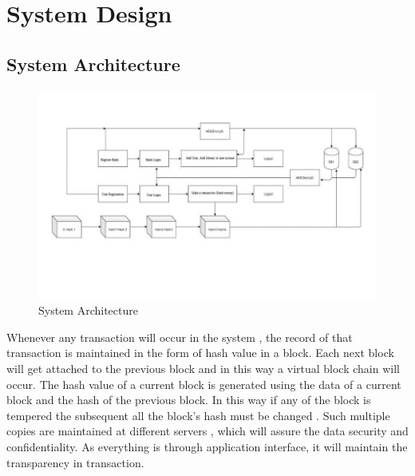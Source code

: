 \documentclass[oneside,a4paper,12pt]{report}
\begin{document}

\chapter{System Design}


\section{System Architecture}

\begin{center}
	\begin{figure}[!htbp]
		\centering
		\includegraphics[scale=0.70]{architecture}
        \caption{System Architecture}
	    \label{fig:System Architecture}
	\end{figure}
\end{center}
Whenever any transaction will occur in the system , the record of that transaction is maintained in the form of hash value in a block. Each next block will get attached to the previous block and in this way a virtual block chain will occur. The hash value of a current block is generated using the data of a current block and the hash of the previous block. In this way if any of the block is tempered the subsequent all the block’s hash must be changed . Such multiple copies are maintained at different servers , which will assure the data security and confidentiality.  As everything is through application interface, it will maintain the transparency in transaction.
\end{document}
